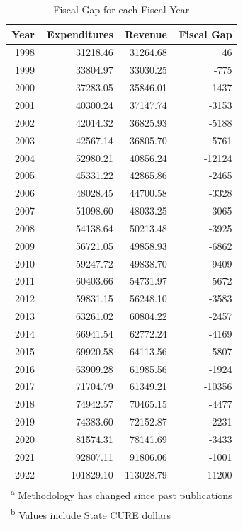 \documentclass[
  letterpaper,
  DIV=11,
  numbers=noendperiod]{scrreport}
\begin{document}
\begin{table}

\caption{Fiscal Gap for each Fiscal Year}
\centering
\begin{tabular}[t]{r|r|r|r}
\hline
Year & Expenditures & Revenue & Fiscal Gap\\
\hline
1998 & 31218.46 & 31264.68 & 46\\
\hline
1999 & 33804.97 & 33030.25 & -775\\
\hline
2000 & 37283.05 & 35846.01 & -1437\\
\hline
2001 & 40300.24 & 37147.74 & -3153\\
\hline
2002 & 42014.32 & 36825.93 & -5188\\
\hline
2003 & 42567.14 & 36805.70 & -5761\\
\hline
2004 & 52980.21 & 40856.24 & -12124\\
\hline
2005 & 45331.22 & 42865.86 & -2465\\
\hline
2006 & 48028.45 & 44700.58 & -3328\\
\hline
2007 & 51098.60 & 48033.25 & -3065\\
\hline
2008 & 54138.64 & 50213.48 & -3925\\
\hline
2009 & 56721.05 & 49858.93 & -6862\\
\hline
2010 & 59247.72 & 49838.70 & -9409\\
\hline
2011 & 60403.66 & 54731.97 & -5672\\
\hline
2012 & 59831.15 & 56248.10 & -3583\\
\hline
2013 & 63261.02 & 60804.22 & -2457\\
\hline
2014 & 66941.54 & 62772.24 & -4169\\
\hline
2015 & 69920.58 & 64113.56 & -5807\\
\hline
2016 & 63909.28 & 61985.56 & -1924\\
\hline
2017 & 71704.79 & 61349.21 & -10356\\
\hline
2018 & 74942.57 & 70465.15 & -4477\\
\hline
2019 & 74383.60 & 72152.87 & -2231\\
\hline
2020 & 81574.31 & 78141.69 & -3433\\
\hline
2021 & 92807.11 & 91806.06 & -1001\\
\hline
2022 & 101829.10 & 113028.79 & 11200\\
\hline
\multicolumn{4}{l}{\textsuperscript{a} Methodology has changed since past publications}\\
\multicolumn{4}{l}{\textsuperscript{b} Values include State CURE dollars}\\
\end{tabular}
\end{table}
\end{document}
